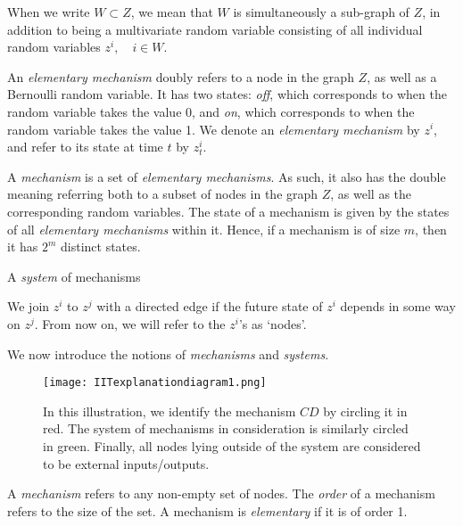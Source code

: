 When we write $W\subset Z$, we mean that $W$ is simultaneously a sub-graph of $Z$, in addition to being a multivariate random variable consisting of all individual random variables $z^i, \quad i \in W$. 

\begin{definition}
	An \textit{elementary mechanism} doubly refers to a node in the graph $Z$, as well as a Bernoulli random variable. It has two states: \textit{off}, which corresponds to when the random variable takes the value 0, and \textit{on}, which corresponds to when the random variable takes the value 1. We denote an \textit{elementary mechanism} by $z^i$, and refer to its state at time $t$ by $z^i_t$.
\end{definition}
	
\begin{definition}
	A \textit{mechanism} is a set of \textit{elementary mechanisms}. As such, it also has the double meaning referring both to a subset of nodes in the graph $Z$, as well as the corresponding random variables. The state of a mechanism is given by the states of all \textit{elementary mechanisms} within it. Hence, if a mechanism is of size $m$, then it has $2^m$ distinct states.
\end{definition}

\begin{definition}
	A \textit{system} of mechanisms
\end{definition}
	

We join $z^i$ to $z^j$ with a directed edge if the future state of $z^i$ depends in some way on $z^j$. From now on, we will refer to the $z^i$'s as `nodes'.

We now introduce the notions of \textit{mechanisms} and \textit{systems}.

\begin{figure}[ht]
	\centering
	
	\texttt{[image: IITexplanationdiagram1.png]}
	\caption{In this illustration, we identify the mechanism $CD$ by circling it in red. The system of mechanisms in consideration is similarly circled in green. Finally, all nodes lying outside of the system are considered to be external inputs/outputs.}
	\label{fig:IIT_illustration1}
\end{figure}


\begin{definition}{A \textit{mechanism} refers to any non-empty set of nodes. The \textit{order} of a mechanism refers to the size of the set. A mechanism is \textit{elementary} if it is of order 1.}
\end{definition}

